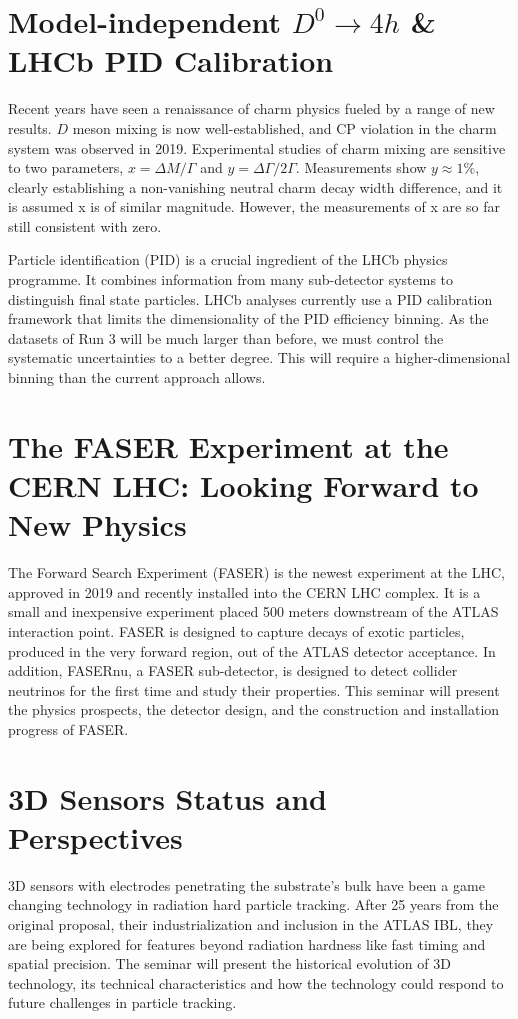 \documentclass[12pt, a4paper, notitlepage, onecolumn]{article}
\begin{document}
\section{Model-independent $D^0\to 4h$ \& LHCb PID Calibration}
\noindent Recent years have seen a renaissance of charm physics fueled by a range of new results. $D$ meson mixing is now well-established, and CP violation in the charm system was observed in 2019. Experimental studies of charm mixing are sensitive to two parameters, $x = \Delta M/\Gamma$ and $y = \Delta \Gamma/2\Gamma$. Measurements show $y\approx 1\%$, clearly establishing a non-vanishing neutral charm decay width difference, and it is assumed x is of similar magnitude. However, the measurements of x are so far still consistent with zero.

 Particle identification (PID) is a crucial ingredient of the LHCb physics programme. It combines information from many sub-detector systems to distinguish final state particles. LHCb analyses currently use a PID calibration framework that limits the dimensionality of the PID efficiency binning. As the datasets of Run 3 will be much larger than before, we must control the systematic uncertainties to a better degree. This will require a higher-dimensional binning than the current approach allows.

\section{The FASER Experiment at the CERN LHC: Looking Forward to New Physics}
\noindent The Forward Search Experiment (FASER) is the newest experiment at the LHC, approved in 2019 and recently installed into the CERN LHC complex. It is a small and inexpensive experiment placed 500 meters downstream of the ATLAS interaction point. FASER is designed to capture decays of exotic particles, produced in the very forward region, out of the ATLAS detector acceptance. In addition, FASERnu, a FASER sub-detector, is designed to detect collider neutrinos for the first time and study their properties. This seminar will present the physics prospects, the detector design, and the construction and installation progress of FASER.

\section{3D Sensors Status and Perspectives}
\noindent 3D sensors with electrodes penetrating the substrate's bulk have been a game changing technology in radiation hard particle tracking. After 25 years from the original proposal, their industrialization and inclusion in the ATLAS IBL, they are being explored for features beyond radiation hardness like fast timing and spatial precision. The seminar will present the historical evolution of 3D technology, its technical characteristics and how the technology could respond to future challenges in particle tracking.
\end{document}

